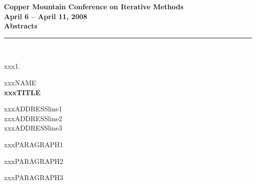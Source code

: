 \documentclass{report}
\begin{document}
\begin{center}
{\Large \bf Copper Mountain Conference on Iterative Methods} \\
{\large \bf April 6 -- April 11, 2008} \\
{\huge \bf Abstracts}
\end{center}


\begin{center}
\rule{6in}{1pt}\\
{\large xxx1. \rule{0mm}{1.5em} xxxNAME \\
{\bf xxxTITLE }}
\end{center}

\begin{center}
	xxxADDRESSline1 \\
	xxxADDRESSline2 \\
	xxxADDRESSline3
\end{center}

xxxPARAGRAPH1

xxxPARAGRAPH2

xxxPARAGRAPH3
\end{document}
